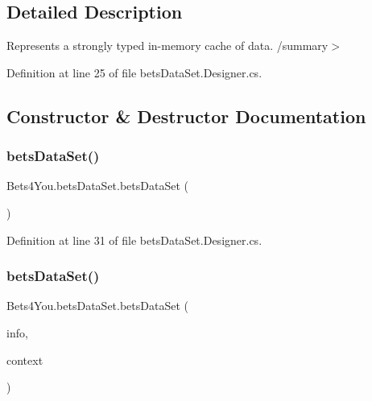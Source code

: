 \subsection{Detailed Description}
Represents a strongly typed in-\/memory cache of data. /summary$>$ 

Definition at line 25 of file bets\+Data\+Set.\+Designer.\+cs.



\subsection{Constructor \& Destructor Documentation}
\mbox{\label{class_bets4_you_1_1bets_data_set_ad5f55a672f35742a4340b72f993e0697}} 
\subsubsection{\texorpdfstring{betsDataSet()}{betsDataSet()}\hspace{0.1cm}{\footnotesize\ttfamily [1/2]}}
{\footnotesize\ttfamily Bets4\+You.\+bets\+Data\+Set.\+bets\+Data\+Set (\begin{DoxyParamCaption}{ }\end{DoxyParamCaption})}



Definition at line 31 of file bets\+Data\+Set.\+Designer.\+cs.

\mbox{\label{class_bets4_you_1_1bets_data_set_ad21b63679b828f26228e5bc340cbe5fa}} 
\subsubsection{\texorpdfstring{betsDataSet()}{betsDataSet()}\hspace{0.1cm}{\footnotesize\ttfamily [2/2]}}
{\footnotesize\ttfamily Bets4\+You.\+bets\+Data\+Set.\+bets\+Data\+Set (\begin{DoxyParamCaption}\item[{global\+::\+System.\+Runtime.\+Serialization.\+Serialization\+Info}]{info,  }\item[{global\+::\+System.\+Runtime.\+Serialization.\+Streaming\+Context}]{context }\end{DoxyParamCaption})\hspace{0.3cm}{\ttfamily [protected]}}



